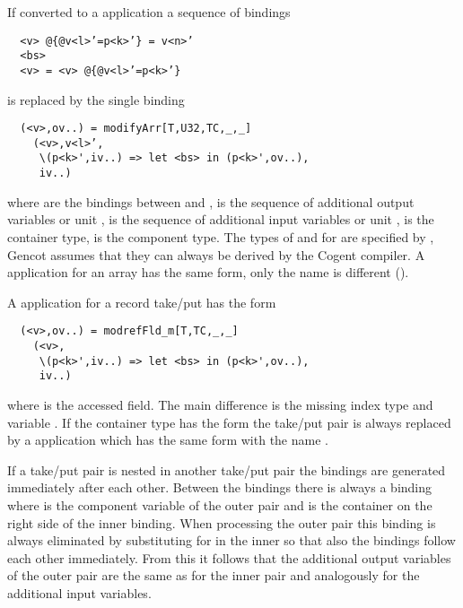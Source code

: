 If converted to a  application a sequence of bindings
\begin{verbatim}
  <v> @{@v<l>’=p<k>’} = v<n>’
  <bs>
  <v> = <v> @{@v<l>’=p<k>’}
\end{verbatim}
is replaced by the single binding
\begin{verbatim}
  (<v>,ov..) = modifyArr[T,U32,TC,_,_]
    (<v>,v<l>’,
     \(p<k>',iv..) => let <bs> in (p<k>',ov..),
     iv..)
\end{verbatim}
where  are the bindings between  and ,  is the sequence of additional output
variables or unit \code{()},  is the sequence of additional input variables or unit \code{()},  is the
container type,  is the component type. The types of  and  for  are specified
by \code{\_}, Gencot assumes that they can always be derived by the Cogent compiler. A  application for an array
has the same form, only the name is different ().

A  application for a record take/put has the form
\begin{verbatim}
  (<v>,ov..) = modrefFld_m[T,TC,_,_]
    (<v>,
     \(p<k>',iv..) => let <bs> in (p<k>',ov..),
     iv..)
\end{verbatim}
where  is the accessed field. The main difference is the missing index type and variable . If the
container type has the form  the take/put pair is always replaced by a  application which
has the same form with the name .

If a take/put pair is nested in another take/put pair the  bindings are generated immediately after each other.
Between the  bindings there is always a binding  where  is the component variable
of the outer pair and  is the container on the right side of the inner  binding. When processing
the outer pair this binding is always eliminated by substituting  for  in the inner  so
that also the  bindings follow each other immediately. From this it follows that the additional output variables
of the outer pair are the same as for the inner pair and analogously for the additional input variables.

